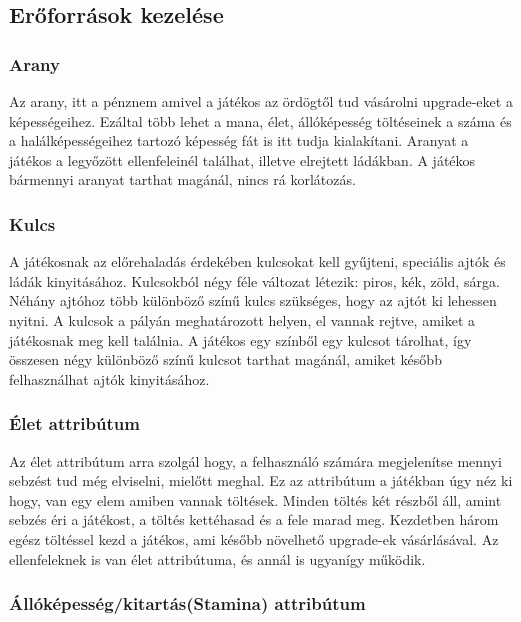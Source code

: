 \documentclass[a4paper]{article}
\begin{document}
\subsection{Erőforrások kezelése}

\subsubsection{Arany}

Az arany, itt a pénznem amivel a játékos az ördögtől tud vásárolni upgrade-eket a képességeihez.
Ezáltal több lehet a mana, élet, állóképesség töltéseinek a száma és a halálképességeihez tartozó képesség fát is itt tudja kialakítani.
Aranyat a játékos a legyőzött ellenfeleinél találhat, illetve elrejtett ládákban.
A játékos bármennyi aranyat tarthat magánál, nincs rá korlátozás.

\subsubsection{Kulcs}

A játékosnak az előrehaladás érdekében kulcsokat kell gyűjteni, speciális ajtók és ládák kinyitásához.
Kulcsokból négy féle változat létezik: piros, kék, zöld, sárga.
Néhány ajtóhoz több különböző színű kulcs szükséges, hogy az ajtót ki lehessen nyitni.
A kulcsok a pályán meghatározott helyen, el vannak rejtve, amiket a játékosnak meg kell találnia.
A játékos egy színből egy kulcsot tárolhat, így összesen négy különböző színű kulcsot tarthat magánál, amiket később felhasználhat ajtók kinyitásához.

\subsubsection{Élet attribútum}

Az élet attribútum arra szolgál hogy, a felhasználó számára megjelenítse mennyi sebzést tud még elviselni, mielőtt meghal.
Ez az attribútum a játékban úgy néz ki hogy, van egy elem amiben vannak töltések.
Minden töltés két részből áll, amint sebzés éri a játékost, a töltés kettéhasad és a fele marad meg.
Kezdetben három egész töltéssel kezd a játékos, ami később növelhető upgrade-ek vásárlásával.
Az ellenfeleknek is van élet attribútuma, és annál is ugyanígy működik.

\subsubsection{Állóképesség/kitartás(Stamina) attribútum}
\end{document}
